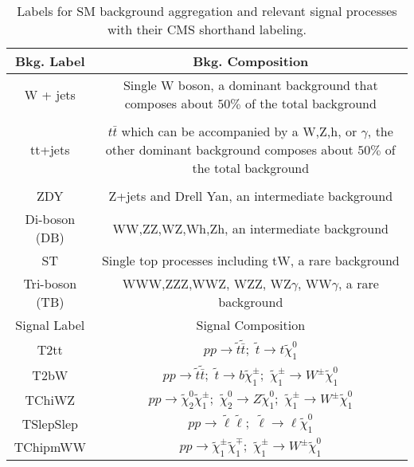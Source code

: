 \begin{table}
\label{tab:bkgsigtab}
\caption{Labels for SM background aggregation and relevant signal processes with their CMS shorthand labeling.}
\begin{tabular}{c|c}
\hline 
Bkg. Label & Bkg. Composition \\ 
\hline 
\hline

W + jets & \makecell{Single W boson, a dominant background that composes \\ about $50\%$ of the total background} \\ 
  & \\
tt+jets & \makecell{$t\bar{t}$ which can be accompanied by a W,Z,h, or $\gamma$, \\ the other dominant background composes about $50\%$ of the total background} \\ 
  & \\
ZDY & Z+jets and Drell Yan, an intermediate background \\ 
Di-boson (DB)& WW,ZZ,WZ,Wh,Zh,  an intermediate background \\ 

ST & Single top processes including tW, a rare background \\ 

Tri-boson (TB) & WWW,ZZZ,WWZ, WZZ, WZ$\gamma$, WW$\gamma$, a rare background  \\ 
\hline 
Signal Label & Signal Composition \\
\hline
\hline
T2tt & $pp \rightarrow \tilde{t} \tilde{\bar{t}}; \, \, \tilde{t}\rightarrow t \tilde{\chi}_1^0$ \\
T2bW & $pp \rightarrow \tilde{t} \tilde{\bar{t}}; \, \, \tilde{t}\rightarrow b \tilde{\chi}_1^\pm; \, \, \tilde{\chi}_1^\pm \rightarrow W^\pm \tilde{\chi}^0_1$ \\
TChiWZ & $pp\rightarrow \tilde{\chi}_2^0 \tilde{\chi}_1^\pm; \, \, \tilde{\chi}_2^0 \rightarrow Z \tilde{\chi}^0_1; \, \, \tilde{\chi}_1^\pm \rightarrow W^\pm \tilde{\chi}^0_1$ \\
TSlepSlep & $pp\rightarrow \tilde{\ell} \tilde{\ell}; \, \, \tilde{\ell} \rightarrow \ell \tilde{\chi}^0_1$ \\
TChipmWW & $pp\rightarrow \tilde{\chi}_1^\pm \tilde{\chi}_1^\mp; \, \,  \tilde{\chi}_1^\pm \rightarrow W^\pm \tilde{\chi}^0_1$  \\
\end{tabular} \\
\end{table}

